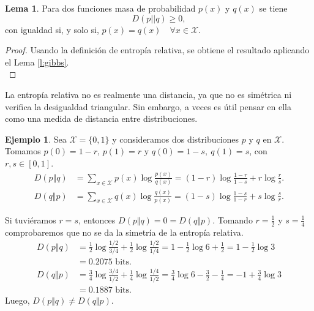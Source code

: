 \documentclass[12pt,a4paper]{report} %
\theoremstyle{definition}
\newtheorem{lemma}[theorem]{Lema}
\newtheorem{example}[theorem]{Ejemplo}
\begin{document}
\begin{lemma}\label{l:ent_rel_pos}
  Para dos funciones masa de probabilidad $p(x)$ y $q(x)$ se tiene \[
  D(p||q) \ge 0,\]
  con igualdad si, y solo si, $p(x) = q(x) \quad \forall x \in \mathcal{X}$.
\end{lemma}
\begin{proof}
  Usando la definición de entropía relativa, se obtiene el resultado aplicando el Lema \ref{l:gibbs}.\\
\end{proof}

La entropía relativa no es realmente una distancia, ya que no es simétrica ni verifica la desigualdad triangular. Sin embargo, a veces es útil pensar en ella como una medida de distancia entre distribuciones.\\

\begin{example}
  Sea $\mathcal{X} = \{0,1\}$ y consideramos dos distribuciones $p$ y $q$ en $\mathcal{X}$. Tomamos $p(0) = 1-r$, $p(1) = r$ y $q(0) = 1-s,\ q(1) = s$, con $r,s \in [0,1]$.
  \begin{align*}
    D(p \Vert q) &= \sum_{x \in \mathcal{X}} p(x) \log \frac{p(x)}{q(x)} = (1 - r) \log \frac{1-r}{1-s} + r \log \frac{r}{s}.\\[5pt]
    D(q \Vert p) &= \sum_{x \in \mathcal{X}}q(x) \log \frac{q(x)}{p(x)} = (1-s) \log \frac{1-s}{1-r} + s \log \frac{s}{r}.
  \end{align*}

  Si tuviéramos $r=s$, entonces $D(p \Vert q) = 0 = D(q \Vert p)$.
  Tomando $r = \frac{1}{2}$ y $s = \frac{1}{4}$ comprobaremos que no se da la simetría de la entropía relativa.
  \begin{align*}
    D(p \Vert q) &= \frac{1}{2} \log \frac{1/2}{3/4} + \frac{1}{2} \log \frac{1/2}{1/4} = 1 - \frac{1}{2} \log 6 + \frac{1}{2} = 1 - \frac{1}{2} \log 3\\ &= 0.2075 \text{ bits}.\\[5pt]
    D(q \Vert p) &= \frac{3}{4} \log \frac{3/4}{1/2} + \frac{1}{4} \log \frac{1/4}{1/2} = \frac{3}{4} \log 6 - \frac{3}{2} - \frac{1}{4} = -1 + \frac{3}{4} \log 3\\ &= 0.1887 \text{ bits}. %
  \end{align*}
Luego, $D(p\Vert q) \ne D(q \Vert p)$.\\
\end{example}
\end{document}
